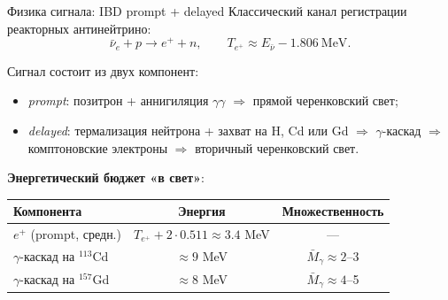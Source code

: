 \documentclass[aspectratio=169,12pt]{beamer}
\begin{document}
\begin{frame}{Физика сигнала: IBD prompt + delayed}
Классический канал регистрации реакторных антинейтрино:
\begin{equation}
    \bar{\nu}_e + p \rightarrow e^+ + n,\qquad T_{e^+} \approx E_{\bar{\nu}} - 1.806~\text{MeV}.
\end{equation}

\smallskip
Сигнал состоит из двух компонент:
\begin{itemize}
    \item \textit{prompt}: позитрон + аннигиляция $\gamma\gamma$ $\Rightarrow$ прямой черенковский свет;
    \item \textit{delayed}: термализация нейтрона + захват на H, Cd или Gd $\Rightarrow$ $\gamma$-каскад $\Rightarrow$ комптоновские электроны $\Rightarrow$ вторичный черенковский свет.
\end{itemize}

\smallskip
\textbf{Энергетический бюджет «в свет»}:
\begin{center}
\small
\begin{tabular}{lcc}
\toprule
Компонента & Энергия & Множественность \\
\midrule
$e^+$ (prompt, средн.) & $T_{e^+} + 2\cdot 0{.}511 \approx 3{.}4$ MeV & --- \\
$\gamma$-каскад на $^{113}$Cd & $\approx 9$ MeV & $\bar M_\gamma \approx 2$–3 \\
$\gamma$-каскад на $^{157}$Gd & $\approx 8$ MeV & $\bar M_\gamma \approx 4$–5 \\
\bottomrule
\end{tabular}
\end{center}
\end{frame}
\end{document}
